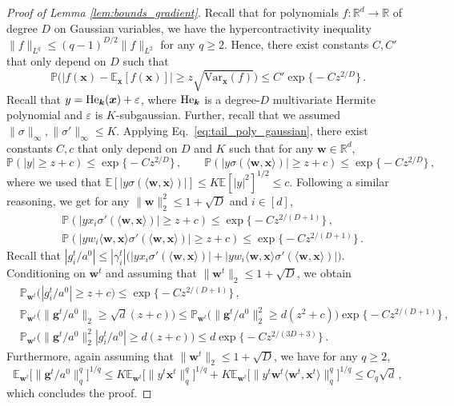 \documentclass[11pt]{article}
\renewcommand{\P}{\mathbb{P}}
\newcommand{\E}{\mathbb{E}}
\newcommand{\R}{\mathbb{R}}
\newcommand{\eps}{\varepsilon}
\newcommand{\<}{\langle}
\renewcommand{\>}{\rangle}
\theoremstyle{definition}
\def\bg{{\boldsymbol g}}
\def\bk{{\boldsymbol k}}
\def\bw{{\boldsymbol w}}
\def\bx{{\boldsymbol x}}
\def\He{{\rm He}}
\def\bg{{\boldsymbol g}}
\def\bw{{\boldsymbol w}}
\def\bx{{\boldsymbol x}}
\def\He{{\rm He}}
\def\bg{{\boldsymbol g}}
\def\bg{{\boldsymbol g}}
\def\eps{\varepsilon}
\begin{document}
\begin{proof}[Proof of Lemma \ref{lem:bounds_gradient}]
Recall that for polynomials $f:\R^d \to \R$ of degree $D$ on Gaussian variables, we have the hypercontractivity inequality $\| f \|_{L^q} \leq (q - 1)^{D/2} \| f \|_{L^2}$ for any $q \geq 2$. Hence, there exist constants $C, C'$ that only depend on $D$ such that
\begin{equation}\label{eq:tail_poly_gaussian}
\P \big( | f(\bx) - \E_{\bx} [f(\bx)] | \geq z\sqrt{ \text{Var}_\bx (f)} \big) \leq C' \exp \big\{ -C z^{2/D} \big\}  \, .
\end{equation}
Recall that $y = \He_{\bk} (\bx) + \eps$, where $\He_{\bk}$ is a degree-$D$ multivariate Hermite polynomial and $\eps$ is $K$-subgaussian. Further, recall that we assumed $\| \sigma \|_\infty, \| \sigma ' \|_\infty \leq K$. Applying Eq.~\eqref{eq:tail_poly_gaussian}, there exist constants $C,c$ that only depend on $D$ and $K$ such that for any $\bw \in \R^d$,
\[ 
\P ( |y | \geq z + c) \leq \exp \big\{ - Cz^{2/D} \big\} \, , \qquad \P ( |y \sigma ( \< \bw , \bx \>) | \geq z + c ) \leq \exp \big\{ - Cz^{2/D} \big\} \, ,
\]
where we used that $\E[ |y \sigma ( \< \bw , \bx \>) | ] \leq K \E [ |y|^2]^{1/2} \leq c $. Following a similar reasoning, we get for any $\| \bw \|_2^2 \leq 1 + \sqrt{D}$ and $i \in [d]$, 
\[
\begin{aligned}
&\P ( | y x_i \sigma ' (\< \bw , \bx \>)| \geq z + c) \leq \exp \big\{ - C z^{2/(D+1)} \big\} \, , \\ &\P ( | y w_i \< \bw , \bx \> \sigma ' (\< \bw , \bx \>)| \geq z + c ) \leq \exp \big\{ - C z^{2/(D+1)} \big\} \, .
\end{aligned}
\]
Recall that $|g_i^t /a^0| \leq |\gamma_i^t | \big(| y x_i \sigma ' (\< \bw , \bx \>)| +  | y w_i \< \bw , \bx \> \sigma ' (\< \bw , \bx \>)| \big)$. Conditioning on $\bw^t$ and assuming that $\| \bw^t \|_2 \leq 1 + \sqrt{D}$, we obtain
\[
\begin{aligned}
&\P_{\bw^t} \big( |g_i^t /a^0| \geq z + c\big) \leq \exp \big\{ - C z^{2/(D+1)} \big\} \, , \\ 
&\P_{\bw^t} \big( \| \bg^t  /a^0\|_2 \geq \sqrt{d} (z + c )   \big)\leq \P_{\bw^t} \big( \| \bg^t  /a^0\|_2^2 \geq d (z^2 + c )   \big) \exp \big\{ - C z^{2/(D+1)} \big\} \, , \\
& \P_{\bw^t} \big( \| \bg^t /a^0\|_2^2 | g_i^t /a^0| \geq d (z + c )  \big) \leq d \exp \big\{ - C z^{2/(3D+3)} \big\} \, .
\end{aligned}
\]
Furthermore, again assuming that $\| \bw^t \|_2 \leq 1 + \sqrt{D}$, we have for any $q \geq 2$,
\[
\E_{\bw^t} \big[ \| \bg^t/a^0 \|_{q}^q  \big]^{1/q} \leq K \E_{\bw^t} \big[ \| y^t  \bx^t  \|_{q}^q  \big]^{1/q}  + K \E_{\bw^t} \big[ \| y^t  \bw^t \< \bw^t , \bx^t \>  \|_{q}^q \big]^{1/q} \leq C_q \sqrt{d} \, ,
\]
which concludes the proof.
\end{proof}
\end{document}
